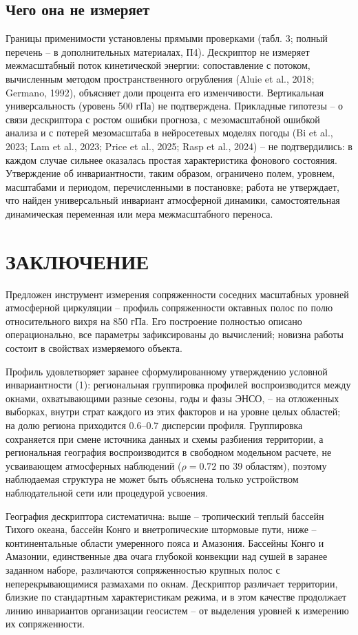 \documentclass[12pt,a4paper]{article}
\begin{document}
\subsection{Чего она не измеряет}

Границы применимости установлены прямыми проверками (табл. 3; полный перечень -- в дополнительных материалах, П4). Дескриптор не измеряет межмасштабный поток кинетической энергии: сопоставление с потоком, вычисленным методом пространственного огрубления (Aluie et al., 2018; Germano, 1992), объясняет доли процента его изменчивости. Вертикальная универсальность (уровень 500 гПа) не подтверждена. Прикладные гипотезы -- о связи дескриптора с ростом ошибки прогноза, с мезомасштабной ошибкой анализа и с потерей мезомасштаба в нейросетевых моделях погоды (Bi et al., 2023; Lam et al., 2023; Price et al., 2025; Rasp et al., 2024) -- не подтвердились: в каждом случае сильнее оказалась простая характеристика фонового состояния. Утверждение об инвариантности, таким образом, ограничено полем, уровнем, масштабами и периодом, перечисленными в постановке; работа не утверждает, что найден универсальный инвариант атмосферной динамики, самостоятельная динамическая переменная или мера межмасштабного переноса.

\section{ЗАКЛЮЧЕНИЕ}

Предложен инструмент измерения сопряженности соседних масштабных уровней атмосферной циркуляции -- профиль сопряженности октавных полос по полю относительного вихря на 850 гПа. Его построение полностью описано операционально, все параметры зафиксированы до вычислений; новизна работы состоит в свойствах измеряемого объекта.

Профиль удовлетворяет заранее сформулированному утверждению условной инвариантности (1): региональная группировка профилей воспроизводится между окнами, охватывающими разные сезоны, годы и фазы ЭНСО, -- на отложенных выборках, внутри страт каждого из этих факторов и на уровне целых областей; на долю региона приходится 0.6--0.7 дисперсии профиля. Группировка сохраняется при смене источника данных и схемы разбиения территории, а региональная география воспроизводится в свободном модельном расчете, не усваивающем атмосферных наблюдений ($\rho = 0.72$ по 39 областям), поэтому наблюдаемая структура не может быть объяснена только устройством наблюдательной сети или процедурой усвоения.

География дескриптора систематична: выше -- тропический теплый бассейн Тихого океана, бассейн Конго и внетропические штормовые пути, ниже -- континентальные области умеренного пояса и Амазония. Бассейны Конго и Амазонии, единственные два очага глубокой конвекции над сушей в заранее заданном наборе, различаются сопряженностью крупных полос с неперекрывающимися размахами по окнам. Дескриптор различает территории, близкие по стандартным характеристикам режима, и в этом качестве продолжает линию инвариантов организации геосистем -- от выделения уровней к измерению их сопряженности.
\end{document}
